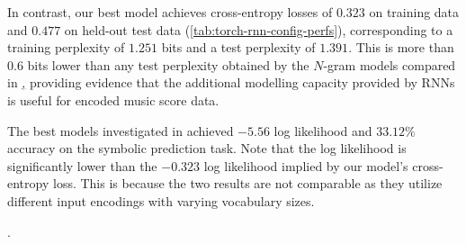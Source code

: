 In contrast, our best model achieves cross-entropy losses of $0.323$ on
training data and $0.477$ on held-out test data
(\vref{tab:torch-rnn-config-perfs}), corresponding to a training perplexity of
$1.251$ bits and a test perplexity of $1.391$. This is more
than $0.6$ bits lower than any test perplexity obtained by the $N$-gram
models compared in \href{tab:baseline-perplexity}, providing evidence
that the additional modelling capacity provided by RNNs is useful
for encoded music score data.

The best models investigated in \citet{Boulanger-Lewandowski2012} achieved
$-5.56$ log likelihood and $33.12\%$ accuracy on the symbolic prediction task.
Note that the log likelihood is significantly lower than the $-0.323$ log
likelihood implied by our model's cross-entropy loss. This is because the two
results are not comparable as they utilize different input encodings with
varying vocabulary sizes.

.

